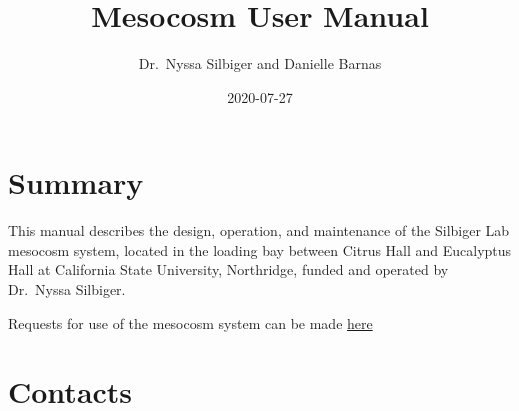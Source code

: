 \documentclass[]{book}
\title{Mesocosm User Manual}
\author{Dr.~Nyssa Silbiger and Danielle Barnas}
\date{2020-07-27}
\begin{document}
\maketitle

{
\setcounter{tocdepth}{1}
\tableofcontents
}
\chapter{Summary}\label{summary}

This manual describes the design, operation, and maintenance of the
Silbiger Lab mesocosm system, located in the loading bay between Citrus
Hall and Eucalyptus Hall at California State University, Northridge,
funded and operated by Dr.~Nyssa Silbiger.

Requests for use of the mesocosm system can be made
\href{https://docs.google.com/forms/d/1LCZG39k8dJmIDLb5l6XBP8-Ow2yxawrKlUB2wUDesqg/edit}{here}

\chapter{Contacts}\label{contacts}
\end{document}
